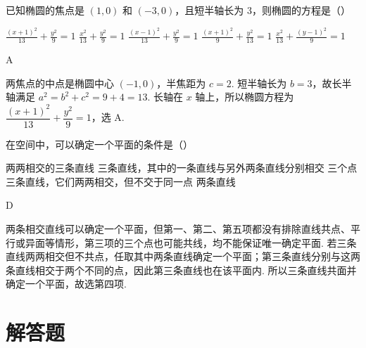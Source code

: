 \begin{problem}

已知椭圆的焦点是 \((1, 0)\) 和 \((-3, 0)\)，且短半轴长为 3，则椭圆的方程是（\quad）

\choicesfive
    {\(\frac{(x + 1)^2}{13} + \frac{y^2}{9} = 1\)}
    {\(\frac{x^2}{13} + \frac{y^2}{9} = 1\)}
    {\(\frac{(x - 1)^2}{13} + \frac{y^2}{9} = 1\)}
    {\(\frac{(x + 1)^2}{9} + \frac{y^2}{13} = 1\)}
    {\(\frac{x^2}{13} + \frac{(y - 1)^2}{9} = 1\)}
\begin{answer}
A
\end{answer}

\begin{solution}
两焦点的中点是椭圆中心 \((-1,0)\)，半焦距为 \(c=2\). 短半轴长为 \(b=3\)，故长半轴满足 \(a^{2}=b^{2}+c^{2}=9+4=13\). 长轴在 \(x\) 轴上，所以椭圆方程为
\(\dfrac{(x+1)^{2}}{13}+\dfrac{y^{2}}9=1\)，选 A.
\end{solution}
\end{problem}

\begin{problem}

在空间中，可以确定一个平面的条件是（\quad）

\choicesfive
    {两两相交的三条直线}
    {三条直线，其中的一条直线与另外两条直线分别相交}
    {三个点}
    {三条直线，它们两两相交，但不交于同一点}
    {两条直线}
\begin{answer}
D
\end{answer}

\begin{solution}
两条相交直线可以确定一个平面，但第一、第二、第五项都没有排除直线共点、平行或异面等情形，第三项的三个点也可能共线，均不能保证唯一确定平面.
若三条直线两两相交但不共点，任取其中两条直线确定一个平面；第三条直线分别与这两条直线相交于两个不同的点，因此第三条直线也在该平面内. 所以三条直线共面并确定一个平面，故选第四项.
\end{solution}
\end{problem}

\section{解答题}

